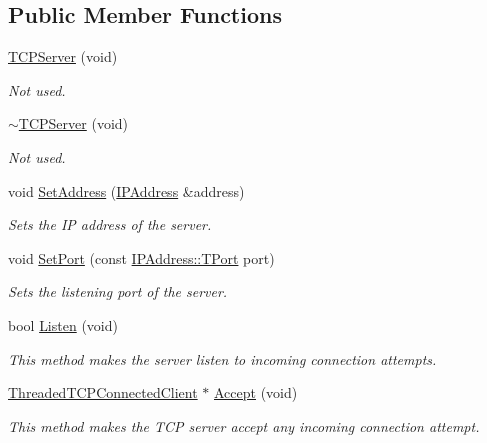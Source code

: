 \subsection*{Public Member Functions}
\begin{DoxyCompactItemize}
\item 
\hyperlink{class_t_c_p_server_ad764ce120c77624cf1c3436ff154dd7a}{T\-C\-P\-Server} (void)
\begin{DoxyCompactList}\small\item\em Not used. \end{DoxyCompactList}\item 
\hyperlink{class_t_c_p_server_ab8524656d788731d2350f50c6174554e}{$\sim$\-T\-C\-P\-Server} (void)
\begin{DoxyCompactList}\small\item\em Not used. \end{DoxyCompactList}\item 
void \hyperlink{class_t_c_p_server_a85bb8272c9599d98bcb28e4156a755fb}{Set\-Address} (\hyperlink{class_i_p_address}{I\-P\-Address} \&address)
\begin{DoxyCompactList}\small\item\em Sets the I\-P address of the server. \end{DoxyCompactList}\item 
void \hyperlink{class_t_c_p_server_a8d5ad30ba42960a84973b57f74a853fa}{Set\-Port} (const \hyperlink{class_i_p_address_a51188195685c31d4258c0a078cc37154}{I\-P\-Address\-::\-T\-Port} port)
\begin{DoxyCompactList}\small\item\em Sets the listening port of the server. \end{DoxyCompactList}\item 
bool \hyperlink{class_t_c_p_server_a2d424428c9107b8b40905f0aefc7d30b}{Listen} (void)
\begin{DoxyCompactList}\small\item\em This method makes the server listen to incoming connection attempts. \end{DoxyCompactList}\item 
\hyperlink{class_threaded_t_c_p_connected_client}{Threaded\-T\-C\-P\-Connected\-Client} $\ast$ \hyperlink{class_t_c_p_server_ae53980fd5e4791bc6e5e15c97a1a796a}{Accept} (void)
\begin{DoxyCompactList}\small\item\em This method makes the T\-C\-P server accept any incoming connection attempt. \end{DoxyCompactList}\end{DoxyCompactItemize}
